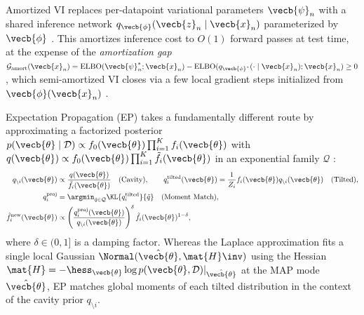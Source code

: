 \documentclass[../../../../master.tex]{subfiles}
\begin{document}
Amortized VI replaces per-datapoint variational parameters $\vecb{\psi}_n$ with a shared inference network $q_{\vecb{\phi}}(\vecb{z}_n \mid \vecb{x}_n)$ parameterized by $\vecb{\phi}$  . This amortizes inference cost to $O(1)$ forward passes at test time, at the expense of the \emph{amortization gap} $\mathcal{G}_{\mathrm{amort}}(\vecb{x}_n) = \mathrm{ELBO}(\vecb{\psi}_n^*; \vecb{x}_n) - \mathrm{ELBO}(q_{\vecb{\phi}^*}(\cdot \mid \vecb{x}_n); \vecb{x}_n) \ge 0$, which semi-amortized VI closes via a few local gradient steps initialized from $\vecb{\phi}(\vecb{x}_n)$  .

Expectation Propagation (EP) takes a fundamentally different route by approximating a factorized posterior $p(\vecb{\theta} \mid \mathcal{D}) \propto f_0(\vecb{\theta}) \prod_{i=1}^K f_i(\vecb{\theta})$ with $q(\vecb{\theta}) \propto f_0(\vecb{\theta}) \prod_{i=1}^K \tilde{f}_i(\vecb{\theta})$ in an exponential family $\mathcal{Q}$ :
\begin{align}
  q_{\setminus i}(\vecb{\theta}) &\propto \frac{q(\vecb{\theta})}{\tilde{f}_i(\vecb{\theta})} \quad\text{(Cavity)}, \qquad
  q_i^{\mathrm{tilted}}(\vecb{\theta}) = \frac{1}{Z_i} f_i(\vecb{\theta}) q_{\setminus i}(\vecb{\theta}) \quad\text{(Tilted)}, \label{eq:vi:ep-cavity} \\
  q_i^{\mathrm{proj}} &= \argmin_{\tilde{q} \in \mathcal{Q}} \KL{q_i^{\mathrm{tilted}}}{\tilde{q}} \quad\text{(Moment Match)}, \label{eq:vi:ep-proj} \\
  \tilde{f}_i^{\mathrm{new}}(\vecb{\theta}) &\propto \left(\frac{q_i^{\mathrm{proj}}(\vecb{\theta})}{q_{\setminus i}(\vecb{\theta})}\right)^{\delta} \tilde{f}_i(\vecb{\theta})^{1-\delta}, \label{eq:vi:ep-update}
\end{align}
where $\delta \in (0, 1]$ is a damping factor. Whereas the Laplace approximation fits a single local Gaussian $\Normal(\hat{\vecb{\theta}}, \mat{H}\inv)$ using the Hessian $\mat{H} = -\hess_{\vecb{\theta}} \log p(\vecb{\theta}, \mathcal{D})|_{\hat{\vecb{\theta}}}$ at the MAP mode $\hat{\vecb{\theta}}$, EP matches global moments of each tilted distribution in the context of the cavity prior $q_{\setminus i}$.
\end{document}
